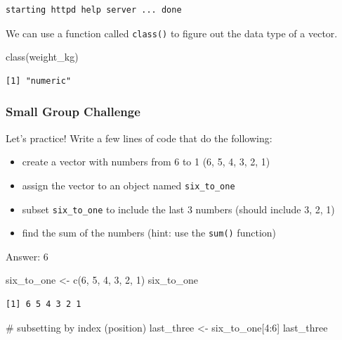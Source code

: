 \documentclass[
  letterpaper,
  DIV=11,
  numbers=noendperiod]{scrartcl}
\newenvironment{Shaded}{\begin{snugshade}}{\end{snugshade}}
\newcommand{\CommentTok}[1]{\textcolor[rgb]{0.37,0.37,0.37}{#1}}
\newcommand{\DecValTok}[1]{\textcolor[rgb]{0.68,0.00,0.00}{#1}}
\newcommand{\FunctionTok}[1]{\textcolor[rgb]{0.28,0.35,0.67}{#1}}
\newcommand{\NormalTok}[1]{\textcolor[rgb]{0.00,0.23,0.31}{#1}}
\newcommand{\OtherTok}[1]{\textcolor[rgb]{0.00,0.23,0.31}{#1}}
\newcommand{\SpecialCharTok}[1]{\textcolor[rgb]{0.37,0.37,0.37}{#1}}
\providecommand{\tightlist}{%
  \setlength{\itemsep}{0pt}\setlength{\parskip}{0pt}}
\begin{document}
\begin{verbatim}
starting httpd help server ... done
\end{verbatim}

We can use a function called \texttt{class()} to figure out the data
type of a vector.

\begin{Shaded}
\begin{Highlighting}[]
\FunctionTok{class}\NormalTok{(weight\_kg)}
\end{Highlighting}
\end{Shaded}

\begin{verbatim}
[1] "numeric"
\end{verbatim}

\subsubsection{Small Group Challenge}\label{small-group-challenge}

Let's practice! Write a few lines of code that do the following:

\begin{itemize}
\tightlist
\item
  create a vector with numbers from 6 to 1 (6, 5, 4, 3, 2, 1)
\item
  assign the vector to an object named \texttt{six\_to\_one}
\item
  subset \texttt{six\_to\_one} to include the last 3 numbers (should
  include 3, 2, 1)
\item
  find the sum of the numbers (hint: use the \texttt{sum()} function)
\end{itemize}

Answer: 6

\begin{Shaded}
\begin{Highlighting}[]
\NormalTok{six\_to\_one }\OtherTok{\textless{}{-}} \FunctionTok{c}\NormalTok{(}\DecValTok{6}\NormalTok{, }\DecValTok{5}\NormalTok{, }\DecValTok{4}\NormalTok{, }\DecValTok{3}\NormalTok{, }\DecValTok{2}\NormalTok{, }\DecValTok{1}\NormalTok{)}
\NormalTok{six\_to\_one}
\end{Highlighting}
\end{Shaded}

\begin{verbatim}
[1] 6 5 4 3 2 1
\end{verbatim}

\begin{Shaded}
\begin{Highlighting}[]
\CommentTok{\# subsetting by index (position)}
\NormalTok{last\_three }\OtherTok{\textless{}{-}}\NormalTok{ six\_to\_one[}\DecValTok{4}\SpecialCharTok{:}\DecValTok{6}\NormalTok{]}
\NormalTok{last\_three}
\end{Highlighting}
\end{Shaded}
\end{document}
